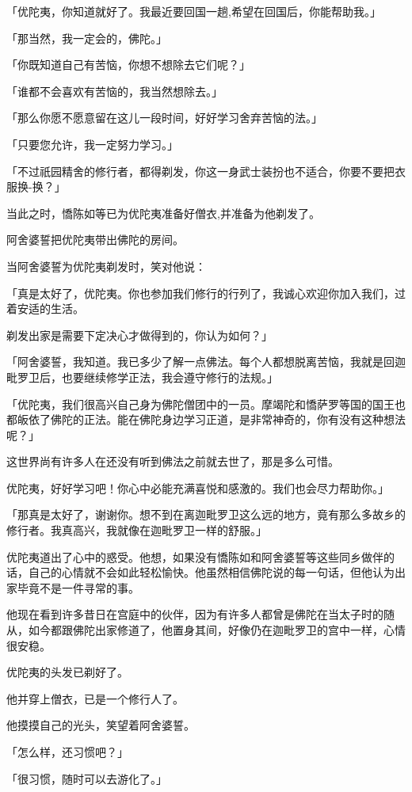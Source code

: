 \documentclass[twoside,openany]{book}
\begin{document}
「优陀夷，你知道就好了。我最近要回国一趟,希望在回国后，你能帮助我。」

「那当然，我一定会的，佛陀。」

「你既知道自己有苦恼，你想不想除去它们呢？」

「谁都不会喜欢有苦恼的，我当然想除去。」

「那么你愿不愿意留在这儿一段时间，好好学习舍弃苦恼的法。」

「只要您允许，我一定努力学习。」

「不过祇园精舍的修行者，都得剃发，你这一身武士装扮也不适合，你要不要把衣服换-换？」

当此之时，憍陈如等已为优陀夷准备好僧衣,并准备为他剃发了。

阿舍婆誓把优陀夷带出佛陀的房间。

当阿舍婆誓为优陀夷剃发时，笑对他说：

「真是太好了，优陀夷。你也参加我们修行的行列了，我诚心欢迎你加入我们，过着安适的生活。

剃发出家是需要下定决心才做得到的，你认为如何？」

「阿舍婆誓，我知道。我已多少了解一点佛法。每个人都想脱离苦恼，我就是回迦毗罗卫后，也要继续修学正法，我会遵守修行的法规。」

「优陀夷，我们很高兴自己身为佛陀僧团中的一员。摩竭陀和憍萨罗等国的国王也都皈依了佛陀的正法。能在佛陀身边学习正道，是非常神奇的，你有没有这种想法呢？」

这世界尚有许多人在还没有听到佛法之前就去世了，那是多么可惜。

优陀夷，好好学习吧！你心中必能充满喜悦和感激的。我们也会尽力帮助你。」

「那真是太好了，谢谢你。想不到在离迦毗罗卫这么远的地方，竟有那么多故乡的修行者。我真高兴，我就像在迦毗罗卫一样的舒服。」

优陀夷道出了心中的惑受。他想，如果没有憍陈如和阿舍婆誓等这些同乡做伴的话，自己的心情就不会如此轻松愉快。他虽然相信佛陀说的每一句话，但他认为出家毕竟不是一件寻常的事。

他现在看到许多昔日在宫庭中的伙伴，因为有许多人都曾是佛陀在当太子时的随从，如今都跟佛陀出家修道了，他置身其间，好像仍在迦毗罗卫的宫中一样，心情很安稳。

优陀夷的头发已剃好了。

他并穿上僧衣，已是一个修行人了。

他摸摸自己的光头，笑望着阿舍婆誓。

「怎么样，还习惯吧？」

「很习惯，随时可以去游化了。」
\end{document}
